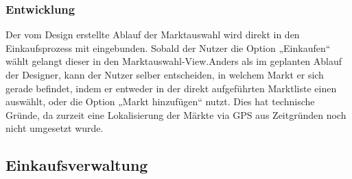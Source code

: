 \documentclass[12pt,a4paper]{article}
\begin{document}
\subsubsection*{Entwicklung}
Der vom Design erstellte Ablauf der Marktauswahl wird direkt in den Einkaufsprozess mit eingebunden. Sobald der Nutzer die Option „Einkaufen“ wählt gelangt dieser in den Marktauswahl-View.Anders als im geplanten Ablauf der Designer, kann der Nutzer selber entscheiden, in welchem Markt er sich gerade befindet, indem er entweder in der direkt aufgeführten Marktliste einen auswählt, oder die Option „Markt hinzufügen“ nutzt. Dies hat technische Gründe, da zurzeit eine Lokalisierung der Märkte via GPS aus Zeitgründen noch nicht umgesetzt wurde.
\subsection{Einkaufsverwaltung}
\end{document}

